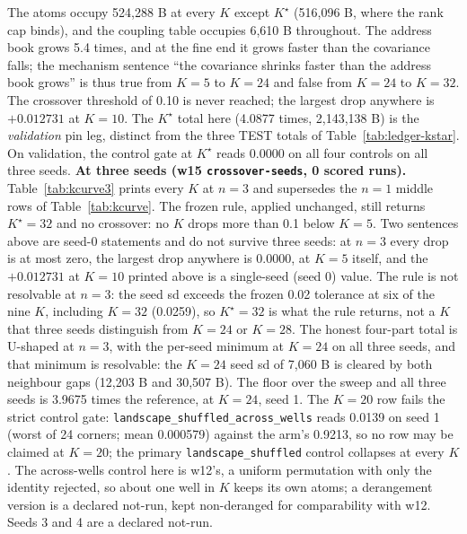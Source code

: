 \documentclass{article} %
\newcommand{\Kstar}{\ensuremath{K^{\star}}}
\begin{document}
\noindent The atoms occupy 524,288 B at every $K$ except $\Kstar$ (516,096 B, where the rank cap
binds), and the coupling table occupies 6,610 B throughout. The address book grows 5.4 times, and
at the fine end it grows faster than the covariance falls; the mechanism sentence ``the
covariance shrinks faster than the address book grows'' is thus true from $K=5$ to $K=24$ and
false from $K=24$ to $K=32$. The crossover threshold of 0.10 is never reached; the largest drop
anywhere is $+0.012731$ at $K=10$. The $\Kstar$ total here (4.0877 times, 2,143,138 B) is the
\emph{validation} pin leg, distinct from the three TEST totals of Table~\ref{tab:ledger-kstar}. %
On validation, the control gate at $\Kstar$ reads 0.0000 on all four controls on all three seeds.
\textbf{At three seeds (w15 \texttt{crossover-seeds}, 0 scored runs).} Table~\ref{tab:kcurve3} prints
every $K$ at $n=3$ and supersedes the $n=1$ middle rows of Table~\ref{tab:kcurve}.
The frozen rule, applied unchanged, still returns $\Kstar=32$ and no crossover: no $K$ drops more
than 0.1 below $K=5$. Two sentences above are seed-0 statements and do not survive three seeds: at
$n=3$ every drop is at most zero, the largest drop anywhere is 0.0000, at $K=5$ itself, and the
$+0.012731$ at $K=10$ printed above is a single-seed (seed 0) value. The rule is not resolvable at $n=3$: the seed sd
exceeds the frozen 0.02 tolerance at six of the nine $K$, including $K=32$ (0.0259), so $\Kstar=32$
is what the rule returns, not a $K$ that three seeds distinguish from $K=24$ or $K=28$. The honest
four-part total is U-shaped at $n=3$, with the per-seed minimum at $K=24$ on all three seeds, and
that minimum is resolvable: the $K=24$ seed sd of 7,060 B is cleared by both neighbour gaps (12,203
B and 30,507 B). The floor over the sweep and all three seeds is 3.9675 times the reference, at
$K=24$, seed 1. The $K=20$ row fails the strict control gate:
\texttt{landscape\_shuffled\_across\_wells} reads 0.0139 on seed 1 (worst of 24 corners; mean
0.000579) against the arm's 0.9213, so no row may be claimed at $K=20$; the primary
\texttt{landscape\_shuffled} control collapses at every $K$. The across-wells control here is
w12's, a uniform permutation with only the identity rejected, so about one well in $K$ keeps its
own atoms; a derangement version is a declared not-run, kept non-deranged for comparability with
w12. Seeds 3 and 4 are a declared not-run.
\end{document}
